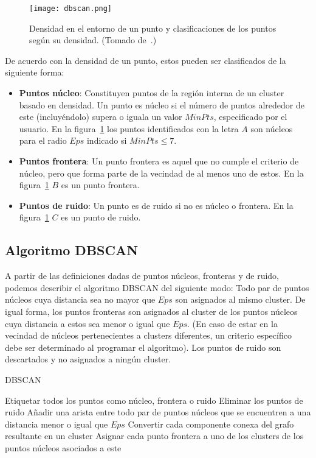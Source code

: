 \begin{figure}[!h]
    \centering
    \texttt{[image: dbscan.png]}
    \caption{Densidad en el entorno de un punto y clasificaciones de los puntos según su densidad. (Tomado de~\cite{Tan05}.)}
    \label{img:dbscan}
\end{figure}

De acuerdo con la densidad de un punto, estos pueden ser clasificados de la siguiente forma:

\begin{itemize}
    \item \textbf{Puntos núcleo}: Constituyen puntos de la región interna de un cluster basado en densidad.
    Un punto es núcleo si el número de puntos alrededor de este (incluyéndolo) supera o iguala un valor $MinPts$, especificado por el usuario.
    En la figura~\ref{img:dbscan} los puntos identificados con la letra $A$ son núcleos para el radio $Eps$ indicado si $MinPts\leq 7$.
    \item \textbf{Puntos frontera}: Un punto frontera es aquel que no cumple el criterio de núcleo, pero que forma parte de la vecindad de al menos uno de estos.
    En la figura~\ref{img:dbscan} $B$ es un punto frontera.
    \item \textbf{Puntos de ruido}: Un punto es de ruido si no es núcleo o frontera.
    En la figura~\ref{img:dbscan} $C$ es un punto de ruido.
\end{itemize}

\subsection{Algoritmo DBSCAN}\label{subsec:algoritmoDbscan}

A partir de las definiciones dadas de puntos núcleos, fronteras y de ruido, podemos describir el algoritmo DBSCAN del siguiente modo: Todo par de puntos núcleos cuya distancia sea no mayor que $Eps$ son asignados al mismo cluster.
De igual forma, los puntos fronteras son asignados al cluster de los puntos núcleos cuya distancia a estos sea menor o igual que $Eps$.
(En caso de estar en la vecindad de núcleos pertenecientes a clusters diferentes, un criterio específico debe ser determinado al programar el algoritmo).
Los puntos de ruido son descartados y no asignados a ningún cluster.

\begin{algorithm}
    \caption{DBSCAN}
    \label{algorithm:DBSCAN}
    Etiquetar todos los puntos como núcleo, frontera o ruido\;
    Eliminar los puntos de ruido\;
    Añadir una arista entre todo par de puntos núcleos que se encuentren a una distancia menor o igual que $Eps$\;
    Convertir cada componente conexa del grafo resultante en un cluster\;
    Asignar cada punto frontera a uno de los clusters de los puntos núcleos asociados a este\;
\end{algorithm}

